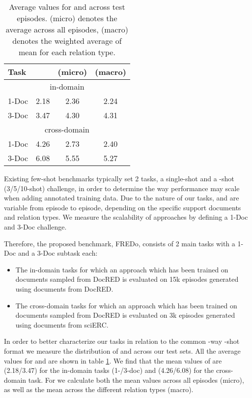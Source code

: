 \documentclass[11pt]{article}
\begin{document}
\begin{table}
\centering
\begin{tabular}{lccc}
Task &  &  (micro) &  (macro) \\
\hline
\multicolumn{4}{c}{in-domain}\\
\hline
1-Doc & 2.18 & 2.36 & 2.24 \\
3-Doc & 3.47 & 4.30 & 4.31 \\
\hline
\multicolumn{4}{c}{cross-domain}\\
\hline

1-Doc & 4.26 & 2.73 & 2.40 \\
3-Doc & 6.08 & 5.55 & 5.27 \\
\hline
\end{tabular}
\caption{\label{tab:n-k-dist-per-rt} Average values for  and  across test episodes.  (micro) denotes the average across all episodes,  (macro) denotes the weighted average of mean  for each relation type.}
\end{table}

Existing few-shot benchmarks typically set 2 tasks, a single-shot and a -shot (3/5/10-shot) challenge, in order to determine the way performance may scale when adding annotated training data.
Due to the nature of our tasks,  and  are variable from episode to episode, depending on the specific support documents and relation types.
We measure the scalability of approaches by defining a 1-Doc and 3-Doc challenge.

Therefore, the proposed benchmark, FREDo, consists of 2 main tasks with a 1-Doc and a 3-Doc subtask each:
\begin{itemize}
    \item The in-domain tasks for which an approach which has been trained on documents sampled from DocRED is evaluated on 15k episodes generated using documents from DocRED.
    \item The cross-domain tasks for which an approach which has been trained on documents sampled from DocRED is evaluated on 3k episodes generated using documents from sciERC.
\end{itemize}

In order to better characterize our tasks in relation to the common -way -shot format we measure the distribution of  and  across our test sets.
All the average values for  and  are shown in table \ref{tab:n-k-dist-per-rt}.
We find that the mean values of  are (2.18/3.47) for the in-domain tasks (1-/3-doc) and (4.26/6.08) for the cross-domain task. For  we calculate both the mean values across all episodes (micro), as well as the mean across the different relation types (macro).
\end{document}
